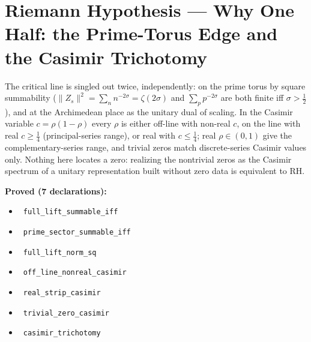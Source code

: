 \documentclass{report}
\theoremstyle{definition}
\begin{document}
\section{Riemann Hypothesis --- Why One Half: the Prime-Torus Edge and the Casimir Trichotomy}
The critical line is singled out twice, independently: on the prime torus by square summability ($\|Z_s\|^2=\sum_n n^{-2\sigma}=\zeta(2\sigma)$ and $\sum_p p^{-2\sigma}$ are both finite iff $\sigma>\tfrac12$), and at the Archimedean place as the unitary dual of scaling. In the Casimir variable $c=\rho(1-\rho)$ every $\rho$ is either off-line with non-real $c$, on the line with real $c\ge\tfrac14$ (principal-series range), or real with $c\le\tfrac14$; real $\rho\in(0,1)$ give the complementary-series range, and trivial zeros match discrete-series Casimir values only. Nothing here locates a zero: realizing the nontrivial zeros as the Casimir spectrum of a unitary representation built without zero data is equivalent to RH.

\noindent\textbf{Proved (7 declarations):}
\begin{itemize}
  \item {}\leanok\ \texttt{full\_lift\_summable\_iff}
  \item {}\leanok\ \texttt{prime\_sector\_summable\_iff}
  \item {}\leanok\ \texttt{full\_lift\_norm\_sq}
  \item {}\leanok\ \texttt{off\_line\_nonreal\_casimir}
  \item {}\leanok\ \texttt{real\_strip\_casimir}
  \item {}\leanok\ \texttt{trivial\_zero\_casimir}
  \item {}\leanok\ \texttt{casimir\_trichotomy}
\end{itemize}
\end{document}
